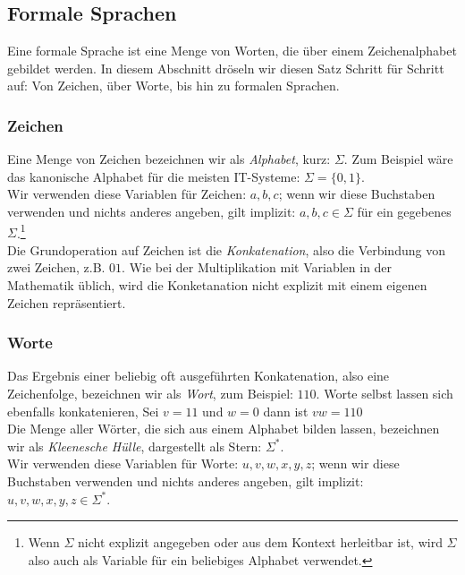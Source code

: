 \subsection{Formale Sprachen}\label{subsec:formaleSprachen}

Eine formale Sprache ist eine Menge von Worten,
die über einem Zeichenalphabet gebildet werden.
In diesem Abschnitt dröseln wir diesen Satz Schritt für Schritt auf:
Von Zeichen, über Worte, bis hin zu formalen Sprachen.

\subsubsection{Zeichen}

Eine Menge von Zeichen bezeichnen wir als \emph{Alphabet}, kurz: $\Sigma$.
Zum Beispiel wäre das kanonische Alphabet für die meisten IT-Systeme: $\Sigma = \{0,1\}$.\\

\noindent
Wir verwenden diese Variablen für Zeichen: $a,b,c$;
wenn wir diese Buchstaben verwenden und nichts anderes angeben,
gilt implizit: $a, b, c \in \Sigma$ für ein gegebenes $\Sigma$.\footnote{
Wenn $\Sigma$ nicht explizit angegeben oder aus dem Kontext herleitbar ist,
wird $\Sigma$ also auch als Variable für ein beliebiges Alphabet verwendet.}\\

\noindent
Die Grundoperation auf Zeichen ist die \emph{Konkatenation},
also die Verbindung von zwei Zeichen, z.B. $01$.
Wie bei der Multiplikation mit Variablen in der Mathematik üblich,
wird die Konketanation nicht explizit mit einem eigenen Zeichen repräsentiert.

\subsubsection{Worte}
Das Ergebnis einer beliebig oft ausgeführten Konkatenation,
also eine Zeichenfolge,
bezeichnen wir als \emph{Wort}, zum Beispiel: $110$.
Worte selbst lassen sich ebenfalls konkatenieren,
Sei $v = 11$ und $w = 0$ dann ist $vw = 110$\\

\noindent
Die Menge aller Wörter,
die sich aus einem Alphabet bilden lassen,
bezeichnen wir als \emph{Kleenesche Hülle}, dargestellt als Stern: $\Sigma^*$.\\

\noindent
Wir verwenden diese Variablen für Worte:
$u, v, w, x, y, z$; wenn wir diese Buchstaben verwenden und nichts anderes angeben,
gilt implizit: $u, v, w, x, y, z \in \Sigma^*$.\\

